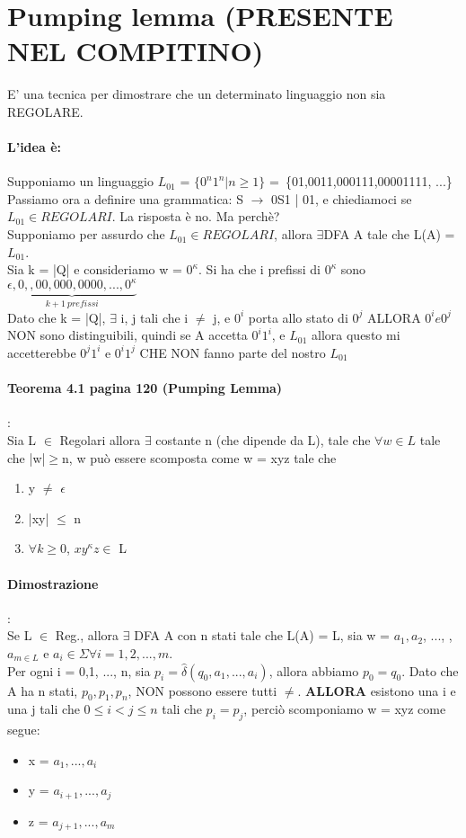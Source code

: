 \documentclass[12pt, a4paper, openany, oneside]{book}
\begin{document}
\section{Pumping lemma (PRESENTE NEL COMPITINO)}
E' una tecnica per dimostrare che un determinato linguaggio non sia REGOLARE.
\paragraph{L'idea è: }Supponiamo un linguaggio $L_{01}$ = $\{0^n 1^n | n\geq 1\}$
= \{01,0011,000111,00001111, ...\}\\
Passiamo ora a definire una grammatica: S $\to$ 0S1 | 01, e chiediamoci se 
$L_{01} \in REGOLARI$. La risposta è no. Ma perchè?\\
Supponiamo per assurdo che $L_{01} \in REGOLARI$, allora $\exists$DFA A tale che
L(A) = $L_{01}$. \\
Sia k = |Q| e consideriamo w = $0^{\kappa}$. Si ha che i prefissi di $0^\kappa$ 
sono $\underbrace{\epsilon, 0, ,00, 000, 0000, ..., 0^{\kappa}}_{k+1 ~ prefissi}$\\
Dato che k = |Q|, $\exists$ i, j  tali che i $\neq$ j, e $0^{i}$ porta allo stato di
$0^{j}$ ALLORA $0^{i} e 0^{j}$ NON sono distinguibili, quindi se A accetta $0^{i}1^{i}$,
e $L_{01}$ allora questo mi accetterebbe $0^{j}1^{i}$ e $0^{i}1^{j}$ CHE NON fanno
parte del nostro $L_{01}$
\paragraph{Teorema 4.1 pagina 120 (Pumping Lemma)}: \\
Sia L $\in$ Regolari allora $\exists$ costante n (che dipende da L), tale che
$\forall w \in L$ tale che |w|$\geq$n, w può essere scomposta come w = xyz tale
che 
\begin{enumerate}
	\item y $\neq$ $\epsilon$
	\item |xy| $\leq$ n
	\item $\forall k \geq 0$, $xy^{\kappa}z \in$ L
\end{enumerate}
\paragraph{Dimostrazione}:\\
Se L $\in$ Reg., allora $\exists$ DFA A con n stati tale che L(A) = L, sia w =
$a_{1}, a_2$, ..., 
, $a_{m \in L}$ e $a_{i} \in \Sigma \forall i = 1, 2, ..., m$.\\
Per ogni i = 0,1, ..., n, sia $p_{i} = \widehat{\delta}(q_0, a_1, ..., a_i)$, allora
abbiamo $p_0 = q_0$. Dato che A ha n stati, $p_0, p_1, p_n$, NON possono essere tutti
$\neq$.
\textbf{ALLORA} esistono una i e una j tali che $0 \leq i < j \leq n$ tali che $p_i
= p_j$, perciò scomponiamo w = xyz come segue:
\begin{itemize}
	\item x = $a_1, ..., a_{i}$
	\item y = $a_{i+1}, ..., a_{j}$
	\item z = $a_{j+1}, ..., a_{m}$
\end{itemize}
\end{document}
